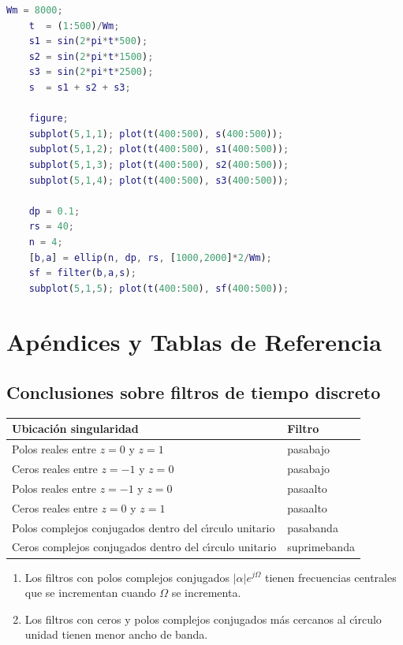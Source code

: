 \begin{lstlisting}[language=Matlab]
	Wm = 8000;
	t  = (1:500)/Wm;
	s1 = sin(2*pi*t*500);
	s2 = sin(2*pi*t*1500);
	s3 = sin(2*pi*t*2500);
	s  = s1 + s2 + s3;
	
	figure;
	subplot(5,1,1); plot(t(400:500), s(400:500));
	subplot(5,1,2); plot(t(400:500), s1(400:500));
	subplot(5,1,3); plot(t(400:500), s2(400:500));
	subplot(5,1,4); plot(t(400:500), s3(400:500));
	
	dp = 0.1;
	rs = 40;
	n = 4;
	[b,a] = ellip(n, dp, rs, [1000,2000]*2/Wm);
	sf = filter(b,a,s);
	subplot(5,1,5); plot(t(400:500), sf(400:500));
\end{lstlisting}


\chapter{Ap\'{e}ndices y Tablas de Referencia}

\section{Conclusiones sobre filtros de tiempo discreto}

\begin{center}
	\renewcommand{\arraystretch}{1.3}
	\begin{tabular}{ll}
		\textbf{Ubicaci\'{o}n singularidad}                             & \textbf{Filtro}               \\ \hline
		Polos reales entre $z=0$ y $z=1$                                & pasabajo                      \\ 
		Ceros reales entre $z=-1$ y $z=0$                               & pasabajo                      \\ 
		Polos reales entre $z=-1$ y $z=0$                               & pasaalto                      \\ 
		Ceros reales entre $z=0$ y $z=1$                                & pasaalto                      \\ 
		Polos complejos conjugados dentro del c\'{\i}rculo unitario     & pasabanda                     \\ 
		Ceros complejos conjugados dentro del c\'{\i}rculo unitario     & suprimebanda 
	\end{tabular}
\end{center}

\begin{enumerate}
	\item Los filtros con polos complejos conjugados $\left| \alpha \right| e^{j\Omega }$ tienen frecuencias centrales que se incrementan cuando $\Omega $ se incrementa.
	\item Los filtros con ceros y polos complejos conjugados m\'{a}s cercanos al c\'{\i}rculo unidad tienen menor ancho de banda.
\end{enumerate}

